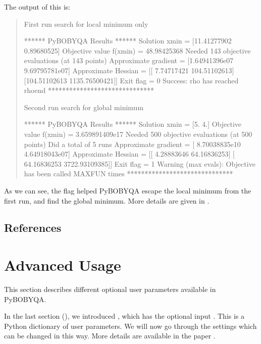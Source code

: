 \documentclass[letterpaper,10pt,english]{sphinxmanual}
\begin{document}
The output of this is:
\begin{quote}

\begin{sphinxVerbatim}[commandchars=\\\{\}]
First run \PYGZhy{} search for local minimum only

****** Py\PYGZhy{}BOBYQA Results ******
Solution xmin = [11.41277902 \PYGZhy{}0.89680525]
Objective value f(xmin) = 48.98425368
Needed 143 objective evaluations (at 143 points)
Approximate gradient = [\PYGZhy{}1.64941396e\PYGZhy{}07  9.69795781e\PYGZhy{}07]
Approximate Hessian = [[   7.74717421 \PYGZhy{}104.51102613]
 [\PYGZhy{}104.51102613 1135.76500421]]
Exit flag = 0
Success: rho has reached rhoend
******************************



Second run \PYGZhy{} search for global minimum

****** Py\PYGZhy{}BOBYQA Results ******
Solution xmin = [5. 4.]
Objective value f(xmin) = 3.659891409e\PYGZhy{}17
Needed 500 objective evaluations (at 500 points)
Did a total of 5 runs
Approximate gradient = [ 8.70038835e\PYGZhy{}10 \PYGZhy{}4.64918043e\PYGZhy{}07]
Approximate Hessian = [[   4.28883646   64.16836253]
 [  64.16836253 3722.93109385]]
Exit flag = 1
Warning (max evals): Objective has been called MAXFUN times
******************************
\end{sphinxVerbatim}
\end{quote}

As we can see, the  flag helped Py\sphinxhyphen{}BOBYQA escape the local minimum from the first run, and find the global minimum. More details are given in .


\section{References}
\label{\detokenize{userguide:references}}

\chapter{Advanced Usage}
\label{\detokenize{advanced:advanced-usage}}\label{\detokenize{advanced::doc}}
This section describes different optional user parameters available in Py\sphinxhyphen{}BOBYQA.

In the last section ({\hyperref[\detokenize{userguide::doc}]{}}), we introduced , which has the optional input . This is a Python dictionary of user parameters. We will now go through the settings which can be changed in this way. More details are available in the paper .
\end{document}
